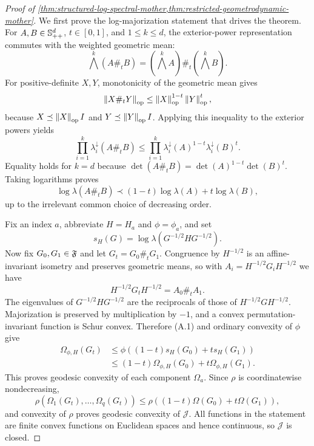 \begin{proof}[Proof of
\cref{thm:structured-log-spectral-mother,thm:restricted-geometrodynamic-mother}]
We first prove the log-majorization statement that drives the theorem. For
\(A,B\in\mathbb S_{++}^d\), \(t\in[0,1]\), and \(1\le k\le d\), the exterior-power
representation commutes with the weighted geometric mean:
\[
  \bigwedge^k(A\#_tB)
  =
  \left(\bigwedge^kA\right)\#_t
  \left(\bigwedge^kB\right).
\]
For positive-definite \(X,Y\), monotonicity of the geometric mean gives
\[
  \left\lVert X\#_tY\right\rVert_{\mathrm{op}}
  \le
  \left\lVert X\right\rVert_{\mathrm{op}}^{1-t}
  \left\lVert Y\right\rVert_{\mathrm{op}}^t,
\]
because \(X\preceq\left\lVert X\right\rVert_{\mathrm{op}}I\) and
\(Y\preceq\left\lVert Y\right\rVert_{\mathrm{op}}I\). Applying this inequality to the
exterior powers yields
\[
  \prod_{i=1}^k\lambda_i^\downarrow(A\#_tB)
  \le
  \prod_{i=1}^k
  \lambda_i^\downarrow(A)^{1-t}
  \lambda_i^\downarrow(B)^t.
\]
Equality holds for \(k=d\) because
\(\det(A\#_tB)=\det(A)^{1-t}\det(B)^t\). Taking logarithms proves
\begin{equation}
  \log\lambda(A\#_tB)
  \prec
  (1-t)\log\lambda(A)+t\log\lambda(B),
  \tag{A.1}
\end{equation}
up to the irrelevant common choice of decreasing order.

Fix an index \(a\), abbreviate \(H=H_a\) and \(\phi=\phi_a\), and set
\[
  s_H(G)=\log\lambda(G^{-1/2}HG^{-1/2}).
\]
Now fix
\(G_0,G_1\in\mathfrak F\) and let \(G_t=G_0\#_tG_1\). Congruence by
\(H^{-1/2}\) is an affine-invariant isometry and preserves geometric means, so
with \(A_i=H^{-1/2}G_iH^{-1/2}\) we have
\[
  H^{-1/2}G_tH^{-1/2}=A_0\#_tA_1.
\]
The eigenvalues of \(G^{-1/2}HG^{-1/2}\) are the reciprocals of those of
\(H^{-1/2}GH^{-1/2}\). Majorization is preserved by multiplication by
\(-1\), and a convex permutation-invariant function is Schur convex.
Therefore (A.1) and ordinary convexity of \(\phi\) give
\[
\begin{aligned}
  \Omega_{\phi,H}(G_t)
  &\le
  \phi\!\left((1-t)s_H(G_0)+t s_H(G_1)\right)\\
  &\le
  (1-t)\Omega_{\phi,H}(G_0)+t\Omega_{\phi,H}(G_1).
\end{aligned}
\]
This proves geodesic convexity of each component \(\Omega_a\). Since
\(\rho\) is coordinatewise nondecreasing,
\[
  \rho(\Omega_1(G_t),\ldots,\Omega_q(G_t))
  \le
  \rho((1-t)\Omega(G_0)+t\Omega(G_1)),
\]
and convexity of \(\rho\) proves geodesic convexity of \(\mathcal J\).
All functions in the statement are finite convex functions on Euclidean
spaces and hence continuous, so \(\mathcal J\) is closed.


\end{proof}
